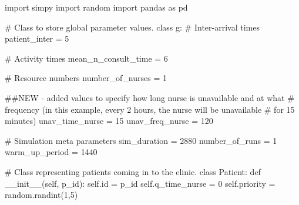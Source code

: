 \documentclass[
  letterpaper,
  DIV=11,
  numbers=noendperiod]{scrreprt}
\newenvironment{Shaded}{}{}
\newcommand{\BuiltInTok}[1]{\textcolor[rgb]{0.84,0.23,0.29}{#1}}
\newcommand{\CommentTok}[1]{\textcolor[rgb]{0.42,0.45,0.49}{#1}}
\newcommand{\DecValTok}[1]{\textcolor[rgb]{0.00,0.36,0.77}{#1}}
\newcommand{\FunctionTok}[1]{\textcolor[rgb]{0.44,0.26,0.76}{#1}}
\newcommand{\ImportTok}[1]{\textcolor[rgb]{0.01,0.18,0.38}{#1}}
\newcommand{\KeywordTok}[1]{\textcolor[rgb]{0.84,0.23,0.29}{#1}}
\newcommand{\NormalTok}[1]{\textcolor[rgb]{0.14,0.16,0.18}{#1}}
\newcommand{\OperatorTok}[1]{\textcolor[rgb]{0.14,0.16,0.18}{#1}}
\newcommand{\VariableTok}[1]{\textcolor[rgb]{0.89,0.38,0.04}{#1}}
\begin{document}
\begin{tcolorbox}[enhanced jigsaw, colframe=quarto-callout-note-color-frame, bottomtitle=1mm, breakable, rightrule=.15mm, coltitle=black, colbacktitle=quarto-callout-note-color!10!white, opacityback=0, leftrule=.75mm, arc=.35mm, toptitle=1mm, title=\textcolor{quarto-callout-note-color}{\faInfo}\hspace{0.5em}{Click here to view the full code}, titlerule=0mm, colback=white, toprule=.15mm, bottomrule=.15mm, left=2mm, opacitybacktitle=0.6]

\begin{Shaded}
\begin{Highlighting}[]
\ImportTok{import}\NormalTok{ simpy}
\ImportTok{import}\NormalTok{ random}
\ImportTok{import}\NormalTok{ pandas }\ImportTok{as}\NormalTok{ pd}

\CommentTok{\# Class to store global parameter values.}
\KeywordTok{class}\NormalTok{ g:}
    \CommentTok{\# Inter{-}arrival times}
\NormalTok{    patient\_inter }\OperatorTok{=} \DecValTok{5}

    \CommentTok{\# Activity times}
\NormalTok{    mean\_n\_consult\_time }\OperatorTok{=} \DecValTok{6}

    \CommentTok{\# Resource numbers}
\NormalTok{    number\_of\_nurses }\OperatorTok{=} \DecValTok{1}

    \CommentTok{\#\#NEW {-} added values to specify how long nurse is unavailable and at what}
    \CommentTok{\# frequency (in this example, every 2 hours, the nurse will be unavailable}
    \CommentTok{\# for 15 minutes)}
\NormalTok{    unav\_time\_nurse }\OperatorTok{=} \DecValTok{15}
\NormalTok{    unav\_freq\_nurse }\OperatorTok{=} \DecValTok{120}

    \CommentTok{\# Simulation meta parameters}
\NormalTok{    sim\_duration }\OperatorTok{=} \DecValTok{2880}
\NormalTok{    number\_of\_runs }\OperatorTok{=} \DecValTok{1}
\NormalTok{    warm\_up\_period }\OperatorTok{=} \DecValTok{1440}

\CommentTok{\# Class representing patients coming in to the clinic.}
\KeywordTok{class}\NormalTok{ Patient:}
    \KeywordTok{def} \FunctionTok{\_\_init\_\_}\NormalTok{(}\VariableTok{self}\NormalTok{, p\_id):}
        \VariableTok{self}\NormalTok{.}\BuiltInTok{id} \OperatorTok{=}\NormalTok{ p\_id}
        \VariableTok{self}\NormalTok{.q\_time\_nurse }\OperatorTok{=} \DecValTok{0}
        \VariableTok{self}\NormalTok{.priority }\OperatorTok{=}\NormalTok{ random.randint(}\DecValTok{1}\NormalTok{,}\DecValTok{5}\NormalTok{)}


\end{Highlighting}
\end{Shaded}
\end{tcolorbox}
\end{document}
